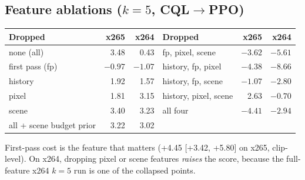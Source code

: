 \documentclass[10pt,a4paper]{article}
\begin{document}
\subsection{Feature ablations ($k=5$, CQL$\to$PPO)}
\begin{center}\small
\begin{tabular}{lrr|lrr}
\toprule
Dropped & x265 & x264 & Dropped & x265 & x264 \\\midrule
none (all) & 3.48 & 0.43 & fp, pixel, scene & $-3.62$ & $-5.61$ \\
first pass (fp) & $-0.97$ & $-1.07$ & history, fp, pixel & $-4.38$ & $-8.66$ \\
history & 1.92 & 1.57 & history, fp, scene & $-1.07$ & $-2.80$ \\
pixel & 1.81 & 3.15 & history, pixel, scene & 2.63 & $-0.70$ \\
scene & 3.40 & 3.23 & all four & $-4.41$ & $-2.94$ \\
all + scene budget prior & 3.22 & 3.02 & & & \\
\bottomrule
\end{tabular}
\end{center}
First-pass cost is the feature that matters (+4.45 [+3.42, +5.80] on x265, clip-level). On x264, dropping pixel or
scene features \emph{raises} the score, because the full-feature x264 $k=5$ run is one of the collapsed points.
\end{document}
